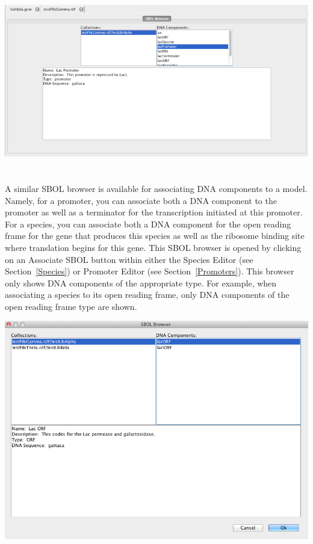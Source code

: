 \documentclass[titlepage,11pt]{article}
\begin{document}
\begin{center}
\includegraphics[height=80mm]{screenshots/SBOLBrowser}
\end{center}

A similar SBOL browser is available for associating DNA components to a model.  Namely, for a promoter, you can associate both a DNA component to the promoter as well as a terminator for the transcription initiated at this promoter.  For a species, you can associate both a DNA component for the open reading frame for the gene that produces this species as well as the ribosome binding site where translation begins for this gene.  This SBOL browser is opened by clicking on an Associate SBOL button within either the Species Editor (see Section~\ref{Species}) or Promoter Editor (see Section~\ref{Promoters}).  This browser only shows DNA components of the appropriate type.  For example, when associating a species to its open reading frame, only DNA components of the open reading frame type are shown.

\begin{center}
\includegraphics[width=160mm]{screenshots/AssociateSBOL}
\end{center}
\end{document}
